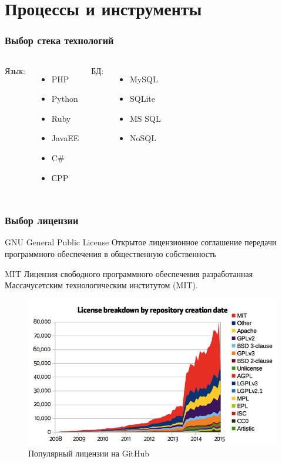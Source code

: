 \documentclass{beamer}
\begin{document}
\section{Процессы и инструменты}

\begin{frame}
\frametitle{Выбор стека технологий}

\begin{columns}[t]
Язык:
\begin{itemize}
\item PHP
\item Python
\item Ruby
\item JavaEE
\item C\#
\item СPP
\end{itemize}

БД:
\begin{itemize}
\item MySQL
\item SQLite
\item MS SQL
\item NoSQL
\end{itemize}
\end{columns}

\end{frame}


\begin{frame}
\frametitle{Выбор лицензии}

\begin{block}{GNU General Public License}
Открытое лицензионное соглашение передачи программного обеспечения в общественную собственность
\end{block}
\bigskip
\begin{block}{MIT}
Лицензия свободного программного обеспечения разработанная Массачусетским технологическим институтом (MIT).
\end{block}

\begin{figure}
\includegraphics[scale=0.30]{res/r1_license}
\caption{Популярный лицензии на GitHub}
\end{figure}

\end{frame}
\end{document}
